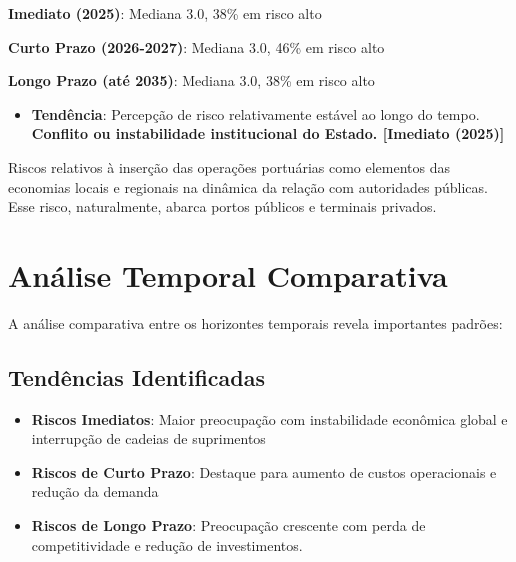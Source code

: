 \documentclass[
  portuguese,
  letterpaper,
  DIV=11,
  numbers=noendperiod]{scrreprt}
\providecommand{\tightlist}{%
  \setlength{\itemsep}{0pt}\setlength{\parskip}{0pt}}
\begin{document}
\begin{tcolorbox}[enhanced jigsaw, breakable, leftrule=.75mm, opacitybacktitle=0.6, coltitle=black, rightrule=.15mm, colbacktitle=quarto-callout-tip-color!10!white, colframe=quarto-callout-tip-color-frame, titlerule=0mm, bottomtitle=1mm, colback=white, toprule=.15mm, toptitle=1mm, left=2mm, title=\textcolor{quarto-callout-tip-color}{\faLightbulb}\hspace{0.5em}{Destaques}, opacityback=0, bottomrule=.15mm, arc=.35mm]

\textbf{Imediato (2025)}: Mediana 3.0, 38\% em risco alto

\textbf{Curto Prazo (2026-2027)}: Mediana 3.0, 46\% em risco alto

\textbf{Longo Prazo (até 2035)}: Mediana 3.0, 38\% em risco alto

\begin{itemize}
\tightlist
\item
  \textbf{Tendência}: Percepção de risco relativamente estável ao longo
  do tempo. \textbf{Conflito ou instabilidade institucional do Estado.
  {[}Imediato (2025){]}}
\end{itemize}

Riscos relativos à inserção das operações portuárias como elementos das
economias locais e regionais na dinâmica da relação com autoridades
públicas. Esse risco, naturalmente, abarca portos públicos e terminais
privados.

\end{tcolorbox}

\section{Análise Temporal
Comparativa}\label{anuxe1lise-temporal-comparativa}

A análise comparativa entre os horizontes temporais revela importantes
padrões:

\subsection{Tendências Identificadas}\label{tenduxeancias-identificadas}

\begin{itemize}
\tightlist
\item
  \textbf{Riscos Imediatos}: Maior preocupação com instabilidade
  econômica global e interrupção de cadeias de suprimentos
\item
  \textbf{Riscos de Curto Prazo}: Destaque para aumento de custos
  operacionais e redução da demanda
\item
  \textbf{Riscos de Longo Prazo}: Preocupação crescente com perda de
  competitividade e redução de investimentos.
\end{itemize}
\end{document}
